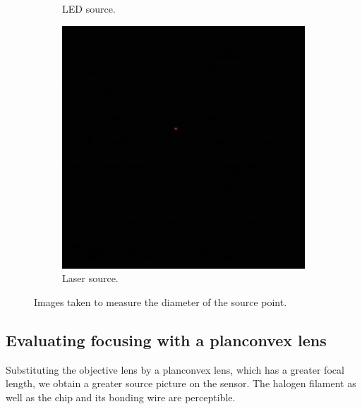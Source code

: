 \documentclass[a4paper, 12pt]{paper}
\begin{document}
\begin{figure}[h]
\begin{subfigure}[p]{0.30\textwidth}
        \caption{LED source.}
    \end{subfigure}
    \begin{subfigure}[p]{0.30\textwidth}
        \includegraphics[width=\textwidth]{img/laser_source}
        \caption{Laser source.}
    \end{subfigure}
    \caption{Images taken to measure the diameter of the source point.}
\label{fig:source_points}
\end{figure}

\subsection{Evaluating focusing with a planconvex lens}

Substituting the objective lens by a planconvex lens, which has a greater focal length, we obtain a greater source picture on the sensor.
The halogen filament as well as the chip and its bonding wire are perceptible.
\end{document}
